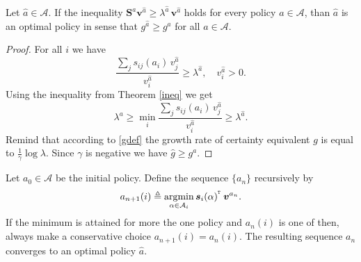 \begin{thm}
\label{criteria2}
Let $\widehat{a}\in\mathcal{A}$. If the inequality $\bm{S}^a\bm{v}^{\widehat{a}}\geq\lambda^{\widehat{a}}\,\bm{v}^{\widehat{a}}$ holds for every policy $a\in\mathcal{A}$, than $\widehat{a}$ is an optimal policy in sense that $g^{\widehat{a}}\geq g^{a}$ for all $a\in\mathcal{A}$.
\end{thm}
\begin{proof}
For all $i$ we have
$$\frac{\sum_j s_{ij}(a_i)\,v^{\widehat{a}}_j}{v^{\widehat{a}}_i}\geq\lambda^{\widehat{a}}, \quad v^{\widehat{a}}_i>0.$$
Using the inequality from Theorem \ref{ineq} we get
$$\lambda^{a}\geq\min_i\frac{\sum_j s_{ij}(a_i)\,v^{\widehat{a}}_j}{v^{\widehat{a}}_i}\geq\lambda^{\widehat{a}}.$$
Remind that according to \eqref{gdef} the growth rate of certainty equivalent $g$ is equal to $\tfrac{1}{\gamma}\log\lambda$. Since $\gamma$ is negative we have $\widehat{g}\geq g^a$. %
\end{proof}
\begin{thm}
\label{PolicyIteration}
Let $a_{0}\in\mathcal{A}$ be the initial policy. Define the sequence $\{a_n\}$ recursively by
\begin{equation}
\label{minimization}
a_{n+1}(i)\triangleq\underset{\alpha\in\mathcal{A}_i}{\operatorname{argmin}}\,\mbox{\boldmath{$s$}}_i(\alpha)^{^{_\texttt T}}\,\mbox{\boldmath{$v$}}^{a_n}.
\end{equation}
If the minimum is attained for more the one policy and $a_n(i)$ is one of then, always make a conservative choice $a_{n+1}(i)=a_{n}(i)$. The resulting sequence $a_n$ converges to an optimal policy $\widehat{a}$.
\end{thm}
